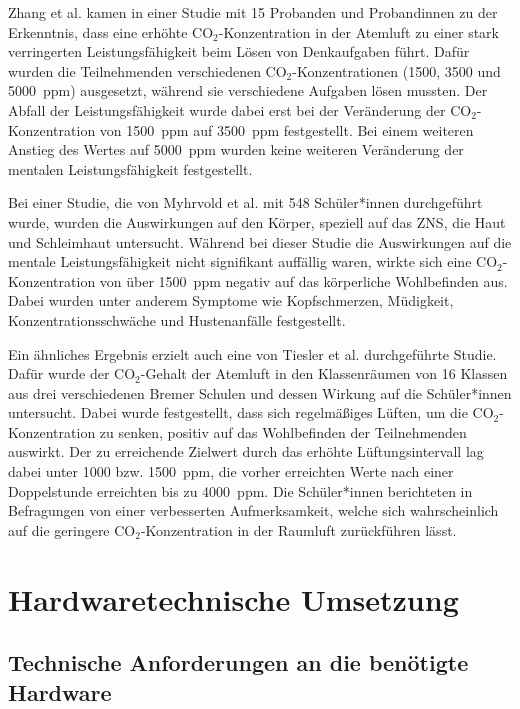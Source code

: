 \documentclass[a4paper,
    12pt,
    headings=small,
    ngerman,
    listof=totoc,
    numbers=noenddot]{scrreprt}[2021/11/13]
\begin{document}
Zhang et al. \autocite{zhang} kamen in einer Studie mit 15 Probanden und Probandinnen zu der Erkenntnis, dass eine erhöhte CO$_2$-Konzentration in der Atemluft zu einer stark verringerten Leistungsfähigkeit beim Lösen von Denkaufgaben führt. Dafür wurden die  Teilnehmenden verschiedenen CO$_2$-Konzentrationen (\si{1500}, \si{3500} und \SI{5000}{\ac{ppm}}) ausgesetzt, während sie verschiedene Aufgaben lösen mussten. Der Abfall der Leistungsfähigkeit wurde dabei erst bei der Veränderung der CO$_2$-Konzentration von \SI{1500}{\ac{ppm}} auf \SI{3500}{\ac{ppm}} festgestellt. Bei einem weiteren Anstieg des Wertes auf \SI{5000}{\ac{ppm}} wurden keine weiteren Veränderung der mentalen Leistungsfähigkeit festgestellt.

Bei einer Studie, die von Myhrvold et al. \autocite{myhrvold} mit 548 Schüler*innen durchgeführt wurde, wurden die Auswirkungen auf den Körper, speziell auf das \ac{ZNS}, die Haut und Schleimhaut untersucht. Während bei dieser Studie die Auswirkungen auf die mentale Leistungsfähigkeit nicht signifikant auffällig waren, wirkte sich eine CO$_2$-Konzentration von über \SI{1500}{\ac{ppm}} negativ auf das körperliche Wohlbefinden aus. Dabei wurden unter anderem Symptome wie Kopfschmerzen, Müdigkeit, Konzentrationsschwäche und Hustenanfälle festgestellt.

Ein ähnliches Ergebnis erzielt auch eine von Tiesler et al. \autocite{tiesler} durchgeführte Studie. Dafür wurde der CO$_2$-Gehalt der Atemluft in den Klassenräumen von 16 Klassen aus drei verschiedenen Bremer Schulen und dessen Wirkung auf die Schüler*innen untersucht. Dabei wurde festgestellt, dass sich regelmäßiges Lüften, um die CO$_2$-Konzentration zu senken, positiv auf das Wohlbefinden der  Teilnehmenden auswirkt. Der zu erreichende Zielwert durch das erhöhte Lüftungsintervall lag dabei unter \si{1000} bzw. \SI{1500}{\ac{ppm}}, die vorher  erreichten Werte nach einer Doppelstunde erreichten bis zu \SI{4000}{\ac{ppm}}. Die Schüler*innen berichteten in Befragungen von einer verbesserten Aufmerksamkeit, welche sich wahrscheinlich auf die geringere CO$_2$-Konzentration in der Raumluft zurückführen lässt.



\chapter{Hardwaretechnische Umsetzung}


\section{Technische Anforderungen an die benötigte Hardware}
\end{document}
